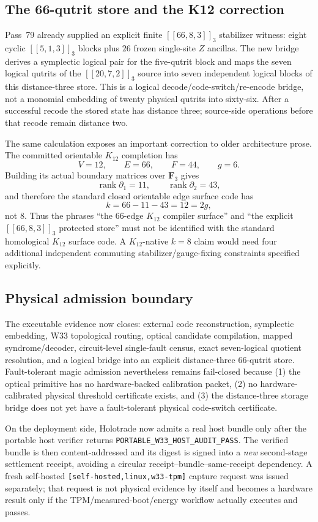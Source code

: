 \subsection{The 66-qutrit store and the K12 correction}

Pass~79 already supplied an explicit finite $[[66,8,3]]_3$ stabilizer witness:
eight cyclic $[[5,1,3]]_3$ blocks plus $26$ frozen single-site $Z$ ancillas.
The new bridge derives a symplectic logical pair for the five-qutrit block and
maps the seven logical qutrits of the $[[20,7,2]]_3$ source into seven independent
logical blocks of this distance-three store.  This is a logical
 decode/code-switch/re-encode bridge, not a monomial embedding of twenty
physical qutrits into sixty-six.  After a successful recode the stored state has
distance three; source-side operations before that recode remain distance two.

The same calculation exposes an important correction to older architecture
prose.  The committed orientable $K_{12}$ completion has
\[
 V=12,\qquad E=66,\qquad F=44,\qquad g=6.
\]
Building its actual boundary matrices over $\mathbf F_3$ gives
\[
 \operatorname{rank}\partial_1=11,\qquad
 \operatorname{rank}\partial_2=43,
\]
and therefore the standard closed orientable edge surface code has
\[
 k=66-11-43=12=2g,
\]
not $8$.  Thus the phrases ``the 66-edge $K_{12}$ compiler surface'' and
``the explicit $[[66,8,3]]_3$ protected store'' must not be identified with the
standard homological $K_{12}$ surface code.  A $K_{12}$-native $k=8$ claim would
need four additional independent commuting stabilizer/gauge-fixing constraints
specified explicitly.

\subsection{Physical admission boundary}

The executable evidence now closes: external code reconstruction, symplectic
embedding, W33 topological routing, optical candidate compilation, mapped
syndrome/decoder, circuit-level single-fault census, exact seven-logical quotient
resolution, and a logical bridge into an explicit distance-three 66-qutrit
store.  Fault-tolerant magic admission nevertheless remains fail-closed because
(1) the optical primitive has no hardware-backed calibration packet,
(2) no hardware-calibrated physical threshold certificate exists, and
(3) the distance-three storage bridge does not yet have a fault-tolerant
physical code-switch certificate.

On the deployment side, Holotrade now admits a real host bundle only after the
portable host verifier returns \texttt{PORTABLE\_W33\_HOST\_AUDIT\_PASS}.  The
verified bundle is then content-addressed and its digest is signed into a
\emph{new} second-stage settlement receipt, avoiding a circular
receipt--bundle--same-receipt dependency.  A fresh self-hosted
\texttt{[self-hosted,linux,w33-tpm]} capture request was issued separately; that
request is not physical evidence by itself and becomes a hardware result only
if the TPM/measured-boot/energy workflow actually executes and passes.
